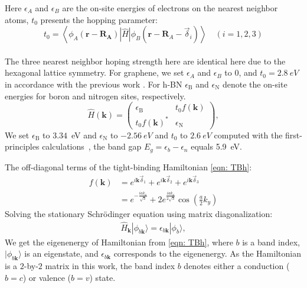 Here $\epsilon_{A}$ and $\epsilon_{B}$ are the on-site energies of electrons on the nearest neighbor atoms, $t_0$ presents the hopping parameter:
$$
t_{0}=\left\langle\phi_{A}\left(\mathbf{r}-\mathbf{R}_{\mathbf{A}}\right)|\hat{H}| \phi_{B}\left(\mathbf{r}-\mathbf{R}_{A}-\vec{\delta}_{i}\right)\right\rangle \quad(i=1,2,3)
$$\\
The three nearest neighbor hoping strength here are identical here due to the hexagonal lattice symmetry. For graphene, we set $\epsilon_{A}$ and $\epsilon_{B}$ to 0, and $t_0=2.8~eV$ in accordance with the previous work  \cite{sarma2011electronic}. For h-BN $\epsilon_{\mathrm{B}}$ and $\epsilon_{\mathrm{N}}$ denote the on-site energies for boron and nitrogen sites, respectively. 
\begin{equation}
\hat{H}(\mathbf{k})=\left(\begin{array}{cc}
\epsilon_{\mathrm{B}} & t_{0} f(\mathbf{k}) \\
t_{0} f(\mathbf{k})^{*} & \epsilon_{\mathrm{N}}
\end{array}\right),
\label{eqn:hBNhamiltonian}
\end{equation}
We set $\epsilon_{\mathrm{B}}$ to $3.34$~eV and $\epsilon_{\mathrm{N}}$ to $-2.56~eV$ and $t_0$ to $2.6~eV$ computed with the first-principles calculations~\cite{PhysRevB.51.6868}, the band gap $E_{g}=\epsilon_{b}-\epsilon_{n}$ equals 5.9~eV. 

The off-diagonal terms of the tight-binding Hamiltonian \ref{eqn: TBh}:
\begin{equation}
 \begin{aligned}
f(\mathbf{k}) &=e^{i \mathbf{k} \vec{\delta}_{1}}+e^{i \mathbf{k} \vec{\delta}_{2}}+e^{i \mathbf{k} \vec{\delta}_{3}} \\
&=e^{-\frac{i a k_{x}}{\sqrt{3}}}+2 e^{\frac{i a k_{x}}{2 \sqrt{3}}} \cos \left(\frac{a}{2} k_{y}\right)
\end{aligned}
\label{eqn:nearest_h}
\end{equation}
Solving the stationary Schrödinger equation using matrix diagonalization:
\begin{align}
\hat{H}_{\mathbf{k}}|\phi_{b \mathbf{k}}\rangle = \epsilon_{b\mathbf{k}}|\phi_{b}\rangle,
\label{eq:eqigenstates-h0}
\end{align}
We get the eigenenergy of Hamiltonian from \ref{eqn: TBh}, where $b$ is a band index, $|\phi_{b\mathbf{k}}\rangle$ is an eigenstate, and $\epsilon_{b\mathbf{k}}$ corresponds to the eigenenergy. As the Hamiltonian is a $2$-by-$2$ matrix in this work, the band index $b$ denotes either a conduction ($b=c$) or valence ($b=v$) state.

